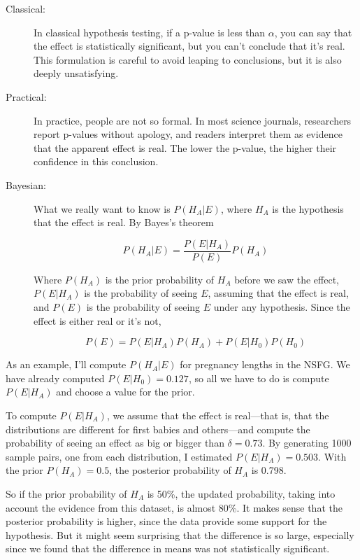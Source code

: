 \documentclass[12pt]{book}
\begin{document}
\begin{description}

\item[Classical:] In classical hypothesis testing, if a p-value
  is less than $\alpha$, you can say that the effect is statistically
  significant, but you can't conclude that it's real.  This
  formulation is careful to avoid leaping to conclusions, but it is
  also deeply unsatisfying.

\item[Practical:] In practice, people are not so formal.  In most
  science journals, researchers report p-values without apology, and
  readers interpret them as evidence that the apparent effect is real.
  The lower the p-value, the higher their confidence in this
  conclusion.

\item[Bayesian:] What we really want to know is $P(H_A | E)$, where
  $H_A$ is the hypothesis that the effect is real.  By Bayes's theorem

  \[ P(H_A | E) = \frac{P(E | H_A)}{P(E)} P(H_A) \]

  Where $P(H_A)$ is the prior probability of $H_A$ before we saw the
  effect, $P(E | H_A)$ is the probability of seeing $E$, assuming that
  the effect is real, and $P(E)$ is the probability of seeing $E$
  under any hypothesis.  Since the effect is either real or it's not,

  \[ P(E) = P(E | H_A)P(H_A) + P(E | H_0)P(H_0) \]

\end{description}

As an example, I'll compute $P(H_A | E)$ for pregnancy lengths in the
NSFG.  We have already computed $P(E | H_0)=0.127$, so all we have to
do is compute $P(E | H_A)$ and choose a value for the prior.

To compute $P(E | H_A)$, we assume that the effect is real---that is,
that the distributions are different for first babies and others---and
compute the probability of seeing an effect as big or bigger than
$\delta = 0.73$.  By generating 1000 sample pairs, one from each
distribution, I estimated $P(E | H_A) = 0.503$.  With the prior
$P(H_A)=0.5$, the posterior probability of $H_A$ is 0.798.


So if the prior probability of $H_A$ is 50\%, the updated
probability, taking into account the evidence from this dataset,
is almost 80\%.  It makes sense that the posterior probability
is higher, since the data provide some support for the hypothesis.
But it might seem surprising that the difference is so large,
especially since we found that the difference in means was not
statistically significant.
\end{document}
